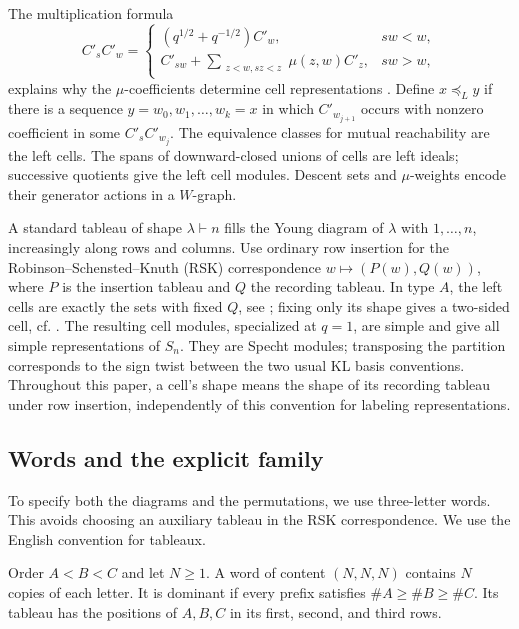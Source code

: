 \documentclass[a4paper,11pt]{amsart}
\newcommand{\qpar}{q}
\numberwithin{equation}{subsection}
\theoremstyle{plain}
\theoremstyle{definition}
\theoremstyle{remark}
\begin{document}
The multiplication formula
\[
C'_s C'_w=
\begin{cases}
(\qpar^{1/2}+\qpar^{-1/2})C'_w,&sw<w,\\
C'_{sw}+\displaystyle\sum_{\substack{z<w,sz<z}}\mu(z,w)C'_z,&sw>w,
\end{cases}
\]
explains why the $\mu$-coefficients determine cell representations
\cite{KL}. Define $x\preceq_L y$ if there is a sequence
$y=w_0,w_1,\ldots,w_k=x$ in which $C'_{w_{j+1}}$ occurs with nonzero
coefficient in some $C'_sC'_{w_j}$. The equivalence classes for mutual
reachability are the left cells. The spans of downward-closed
unions of cells are left ideals; successive quotients give the
left cell modules. Descent sets and $\mu$-weights encode their
generator actions in a $W$-graph.

A standard tableau of shape $\lambda\vdash n$ fills the Young diagram
of $\lambda$ with $1,\ldots,n$, increasingly along rows and columns.
Use ordinary row insertion for the Robinson--Schensted--Knuth (RSK) correspondence
$w\mapsto(P(w),Q(w))$, where $P$ is the insertion tableau and $Q$ the
recording tableau. In type $A$, the left cells are exactly the sets
with fixed $Q$, see \cite[Theorem A]{Ariki}; fixing only its shape gives a two-sided cell, cf. \cite[p.~199, Exercise~11(b)]{BjornerBrenti}.
The resulting cell modules, specialized at $\qpar=1$,
are simple and give all simple representations of $S_n$.
They are Specht modules; transposing the partition corresponds to
the sign twist between the two usual KL basis conventions. Throughout
this paper, a cell's shape means the shape of its recording tableau
under row insertion, independently of this convention for labeling representations.

\subsection{Words and the explicit family}

To specify both the diagrams and the permutations, we use three-letter
words. This avoids choosing an auxiliary tableau in the RSK correspondence. We use the English convention for tableaux.

\begin{definition}\label{def:words2}
Order $A<B<C$ and let $N\ge1$. A word of content $(N,N,N)$ contains $N$ copies of each
letter. It is dominant if every prefix satisfies
$\#A\ge\#B\ge\#C$. Its tableau has the positions of $A,B,C$ in its
first, second, and third rows. 
\end{definition}
\end{document}

